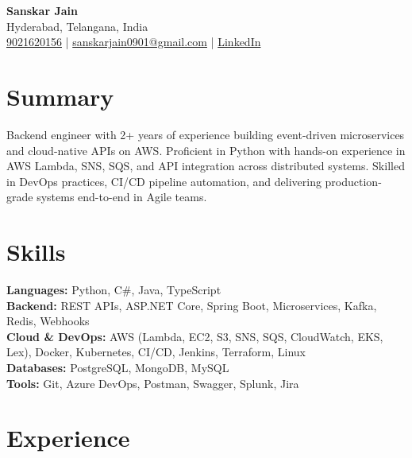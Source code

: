 \documentclass[a4paper,10pt]{article}
\begin{document}
\begin{center}
    {\LARGE \textbf{Sanskar Jain}} \\
    Hyderabad, Telangana, India \\
    \href{tel:9021620156}{9021620156} \;|\;
    \href{mailto:sanskarjain0901@gmail.com}{sanskarjain0901@gmail.com} \;|\;
    \href{https://www.linkedin.com/in/sanskar-jain0901/}{LinkedIn}
\end{center}

\vspace{3pt}

\section*{Summary}
Backend engineer with 2+ years of experience building event-driven microservices and cloud-native APIs on AWS.
Proficient in Python with hands-on experience in AWS Lambda, SNS, SQS, and API integration across distributed systems.
Skilled in DevOps practices, CI/CD pipeline automation, and delivering production-grade systems end-to-end in Agile teams.

\section*{Skills}
\textbf{Languages:} Python, C\#, Java, TypeScript \\
\textbf{Backend:} REST APIs, ASP.NET Core, Spring Boot, Microservices, Kafka, Redis, Webhooks \\
\textbf{Cloud \& DevOps:} AWS (Lambda, EC2, S3, SNS, SQS, CloudWatch, EKS, Lex), Docker, Kubernetes, CI/CD, Jenkins, Terraform, Linux \\
\textbf{Databases:} PostgreSQL, MongoDB, MySQL \\
\textbf{Tools:} Git, Azure DevOps, Postman, Swagger, Splunk, Jira

\section*{Experience}
\end{document}
